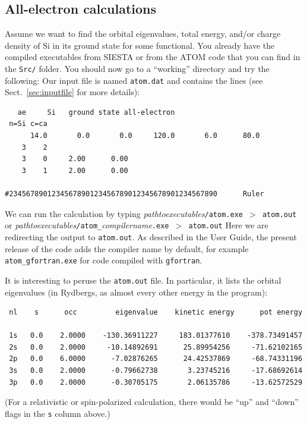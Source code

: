 \documentclass[11pt]{article}
\begin{document}
\subsection{All-electron calculations}

Assume we want to find the orbital eigenvalues, total energy, and/or
charge density of Si in its ground state for some functional.
You already have the compiled executables from \textsc{SIESTA} or
from the \textsc{ATOM} code that you can find in the \texttt{Src/} folder.
You should now go to a ``working''
directory and try the following:  Our
input file is named \texttt{atom.dat} and contains the lines (see
Sect.~\ref{sec:inputfile} for more details):

\begin{verbatim}
   ae     Si   ground state all-electron
 n=Si c=ca
      14.0       0.0       0.0     120.0       6.0      80.0
    3    2
    3    0     2.00      0.00
    3    1     2.00      0.00

#2345678901234567890123456789012345678901234567890      Ruler
\end{verbatim}

We can run the calculation by typing
\textit{pathtoexecutables}\texttt{/atom.exe $>$ atom.out}
or \textit{pathtoexecutables}\texttt{/atom\_}\textit{compilername}\texttt{.exe $>$ atom.out}
Here we are redirecting the output to \texttt{atom.out}.
As described in the User Guide, the present release of the code adds
the compiler name by default, for example \texttt{atom\_gfortran.exe} for code compiled
with \texttt{gfortran}.


It is interesting to peruse the \texttt{atom.out} file.
In particular, it lists the orbital eigenvalues (in Rydbergs, as almost
every other energy in the program):

\begin{verbatim}
 nl    s      occ         eigenvalue    kinetic energy      pot energy

 1s   0.0    2.0000    -130.36911227     183.01377610    -378.73491457
 2s   0.0    2.0000     -10.14892691      25.89954256     -71.62102165
 2p   0.0    6.0000      -7.02876265      24.42537869     -68.74331196
 3s   0.0    2.0000      -0.79662738       3.23745216     -17.68692614
 3p   0.0    2.0000      -0.30705175       2.06135786     -13.62572529
\end{verbatim}

(For a relativistic or spin-polarized calculation, there would be
``up'' and ``down'' flags in the {\tt s} column above.)
\end{document}
